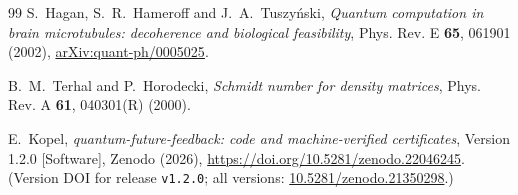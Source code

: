 \documentclass[11pt,a4paper]{article}
\theoremstyle{definition}
\theoremstyle{remark}
\begin{document}
\begin{thebibliography}{99}
 S.~Hagan, S.~R.~Hameroff and J.~A.~Tuszy\'nski,
\emph{Quantum computation in brain microtubules: decoherence and biological feasibility}, Phys. Rev. E \textbf{65}, 061901 (2002),
\href{https://arxiv.org/abs/quant-ph/0005025}{arXiv:quant-ph/0005025}.

 B.~M.~Terhal and P.~Horodecki,
\emph{Schmidt number for density matrices},
Phys. Rev. A \textbf{61}, 040301(R) (2000).

 E.~Kopel,
\emph{quantum-future-feedback: code and machine-verified certificates},
Version 1.2.0 [Software], Zenodo (2026),
\url{https://doi.org/10.5281/zenodo.22046245}.
(Version DOI for release \texttt{v1.2.0}; all versions:
\href{https://doi.org/10.5281/zenodo.21350298}{10.5281/zenodo.21350298}.)

\end{thebibliography}
\end{document}
